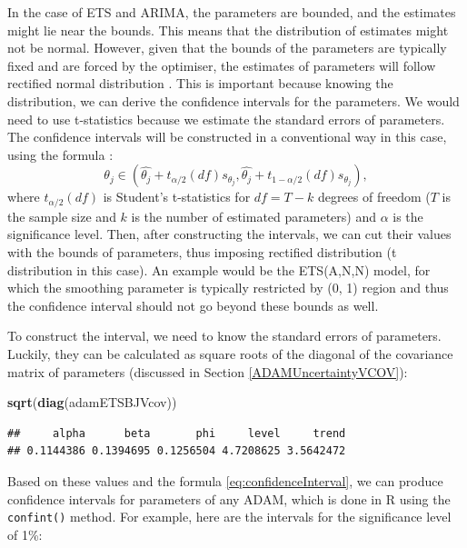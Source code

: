 \documentclass[]{book}
\newenvironment{Shaded}{\begin{snugshade}}{\end{snugshade}}
\newcommand{\KeywordTok}[1]{\textcolor[rgb]{0.13,0.29,0.53}{\textbf{#1}}}
\newcommand{\NormalTok}[1]{#1}
\theoremstyle{definition}
\theoremstyle{definition}
\theoremstyle{definition}
\theoremstyle{definition}
\theoremstyle{remark}
\begin{document}
In the case of ETS and ARIMA, the parameters are bounded, and the estimates might lie near the bounds. This means that the distribution of estimates might not be normal. However, given that the bounds of the parameters are typically fixed and are forced by the optimiser, the estimates of parameters will follow rectified normal distribution \citep{WikipediaRectifiedNormal}. This is important because knowing the distribution, we can derive the confidence intervals for the parameters. We would need to use t-statistics because we estimate the standard errors of parameters. The confidence intervals will be constructed in a conventional way in this case, using the formula \citep[see Section 5.1 of][]{SvetunkovSBA}:
\begin{equation}
    \theta_j \in (\hat{\theta_j} + t_{\alpha/2}(df) s_{\theta_j}, \hat{\theta_j} + t_{1-\alpha/2}(df) s_{\theta_j}), 
    \label{eq:confidenceInterval}
\end{equation}
where \(t_{\alpha/2}(df)\) is Student's t-statistics for \(df=T-k\) degrees of freedom (\(T\) is the sample size and \(k\) is the number of estimated parameters) and \(\alpha\) is the significance level. Then, after constructing the intervals, we can cut their values with the bounds of parameters, thus imposing rectified distribution (t distribution in this case). An example would be the ETS(A,N,N) model, for which the smoothing parameter is typically restricted by (0, 1) region and thus the confidence interval should not go beyond these bounds as well.

To construct the interval, we need to know the standard errors of parameters. Luckily, they can be calculated as square roots of the diagonal of the covariance matrix of parameters (discussed in Section \ref{ADAMUncertaintyVCOV}):

\begin{Shaded}
\begin{Highlighting}[]
\KeywordTok{sqrt}\NormalTok{(}\KeywordTok{diag}\NormalTok{(adamETSBJVcov))}
\end{Highlighting}
\end{Shaded}

\begin{verbatim}
##     alpha      beta       phi     level     trend 
## 0.1144386 0.1394695 0.1256504 4.7208625 3.5642472
\end{verbatim}

Based on these values and the formula \eqref{eq:confidenceInterval}, we can produce confidence intervals for parameters of any ADAM, which is done in R using the \texttt{confint()} method. For example, here are the intervals for the significance level of 1\%:
\end{document}
